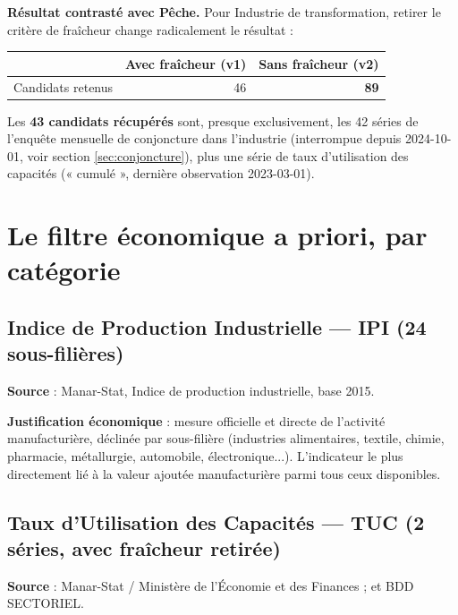 \documentclass[11pt,a4paper]{article}
\begin{document}
\begin{noteboxbleu}
\textbf{Résultat contrasté avec Pêche.} Pour Industrie de transformation, retirer le critère de fraîcheur change radicalement le résultat :

\begin{center}
\begin{tabular}{lrr}
\toprule
& \textbf{Avec fraîcheur (v1)} & \textbf{Sans fraîcheur (v2)} \\
\midrule
Candidats retenus & 46 & \textbf{89} \\
\bottomrule
\end{tabular}
\end{center}

Les \textbf{43 candidats récupérés} sont, presque exclusivement, les 42 séries de l'enquête mensuelle de conjoncture dans l'industrie (interrompue depuis 2024-10-01, voir section \ref{sec:conjoncture}), plus une série de taux d'utilisation des capacités (« cumulé », dernière observation 2023-03-01).
\end{noteboxbleu}

\section{Le filtre économique a priori, par catégorie}

\subsection{Indice de Production Industrielle --- IPI (24 sous-filières)}

\textbf{Source} : Manar-Stat, Indice de production industrielle, base 2015.

\textbf{Justification économique} : mesure officielle et directe de l'activité manufacturière, déclinée par sous-filière (industries alimentaires, textile, chimie, pharmacie, métallurgie, automobile, électronique...). L'indicateur le plus directement lié à la valeur ajoutée manufacturière parmi tous ceux disponibles.

\subsection{Taux d'Utilisation des Capacités --- TUC (2 séries, avec fraîcheur retirée)}

\textbf{Source} : Manar-Stat / Ministère de l'Économie et des Finances ; et BDD SECTORIEL.
\end{document}
